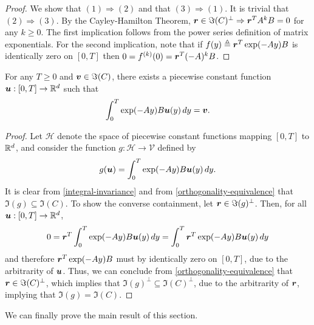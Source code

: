 \begin{proof}
We show that $(1) \Rightarrow (2)$ and that $(3) \Rightarrow (1)$. It is trivial that $(2) \Rightarrow (3)$.
By the Cayley-Hamilton Theorem, $\boldsymbol{r} \in \Im(C)^{\perp} \Rightarrow \boldsymbol{r}^{T} A^{k} B = 0$ for any $k \geq 0$. The first implication follows from the power series definition of matrix exponentials. For the second implication, note that if $f(y) \triangleq \boldsymbol{r}^{T} \exp(-Ay) B$ is identically zero on $[0,T]$ then $0 = f^{(k)} (0) = \boldsymbol{r}^{T} (-A)^{k} B$.
\end{proof}

\begin{proposition}
For any $T \geq 0$ and $\boldsymbol{v} \in \Im(C)$, there exists a piecewise constant function $\boldsymbol{u} : [0, T] \rightarrow \mathbb{R}^{d}$ such that
\begin{equation}
\label{control-existence}
\int_{0}^{T} \exp(-Ay) B \myvector{u}(y) \, dy = \myvector{v}.
\end{equation}
\end{proposition}

\begin{proof}
Let $\mathcal{H}$ denote the space of piecewise constant functions mapping $[0,T]$ to $\mathbb{R}^{d}$, and consider the function $g : \mathcal{H} \rightarrow \mathcal{V}$ defined by
\begin{equation*}
g(\boldsymbol{u}) = \int_{0}^{T} \exp(-Ay) B \boldsymbol{u}(y) \, dy.
\end{equation*}
It is clear from \cref{integral-invariance} and from \cref{orthogonality-equivalence} that $\Im(g) \subseteq \Im(C)$. To show the converse containment, let $\boldsymbol{r} \in \Im(g)^{\perp}$. Then, for all $\boldsymbol{u} : [0,T] \rightarrow \mathbb{R}^{d}$,
\begin{equation*}
0 = \boldsymbol{r}^{T} \int_{0}^{T} \exp(-Ay) B \boldsymbol{u}(y) \, dy = \int_{0}^{T} \boldsymbol{r}^{T} \exp(-Ay) B \boldsymbol{u}(y) \, dy
\end{equation*}
and therefore $\boldsymbol{r}^{T} \exp(-Ay) B$ must by identically zero on $[0,T]$, due to the arbitrarity of $\boldsymbol{u}$. Thus, we can conclude from \cref{orthogonality-equivalence} that $\boldsymbol{r} \in \Im(C)^{\perp}$, which implies that $\Im(g)^{\perp} \subseteq \Im(C)^{\perp}$, due to the arbitrarity of $\boldsymbol{r}$, implying that $\Im(g) = \Im(C)$.
\end{proof}

We can finally prove the main result of this section.

